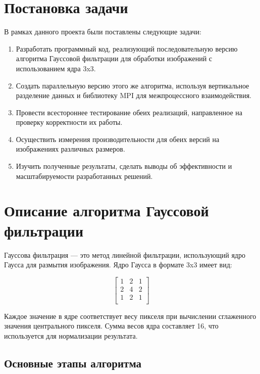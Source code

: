 \documentclass[12pt]{article}
\begin{document}

\section{Постановка задачи}

В рамках данного проекта были поставлены следующие задачи:

\begin{enumerate}
    \item Разработать программный код, реализующий последовательную версию алгоритма Гауссовой фильтрации для обработки изображений с использованием ядра 3x3.
    \item Создать параллельную версию этого же алгоритма, используя вертикальное разделение данных и библиотеку MPI для межпроцессного взаимодействия.
    \item Провести всестороннее тестирование обеих реализаций, направленное на проверку корректности их работы.
    \item Осуществить измерения производительности для обеих версий на изображениях различных размеров.
    \item Изучить полученные результаты, сделать выводы об эффективности и масштабируемости разработанных решений.
\end{enumerate}


\section{Описание алгоритма Гауссовой фильтрации}

Гауссова фильтрация — это метод линейной фильтрации, использующий ядро Гаусса для размытия изображения. Ядро Гаусса в формате 3x3 имеет вид:

\[
\begin{bmatrix}
1 & 2 & 1 \\
2 & 4 & 2 \\
1 & 2 & 1 \\
\end{bmatrix}
\]

Каждое значение в ядре соответствует весу пикселя при вычислении сглаженного значения центрального пикселя. Сумма весов ядра составляет 16, что используется для нормализации результата.

\subsection{Основные этапы алгоритма}
\end{document}
